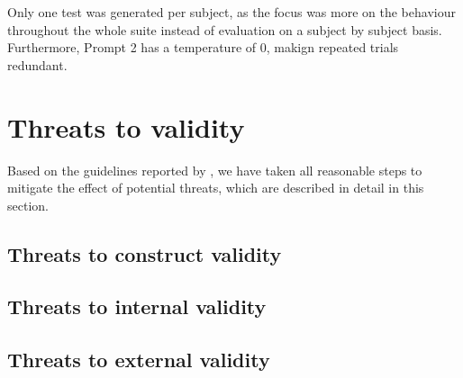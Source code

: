 Only one test was generated per subject, as the focus was more on the behaviour throughout the whole suite instead of evaluation on a subject by subject basis.
Furthermore, Prompt 2 has a temperature of 0, makign repeated trials redundant.

\section{Threats to validity}


Based on the guidelines reported by \citet{wohlin2012experimentation}, we have
taken all reasonable steps to mitigate the effect of potential threats, which
are described in detail in this section.

\subsection{Threats to construct validity}
%

\subsection{Threats to internal validity}
%

\subsection{Threats to external validity}
%
